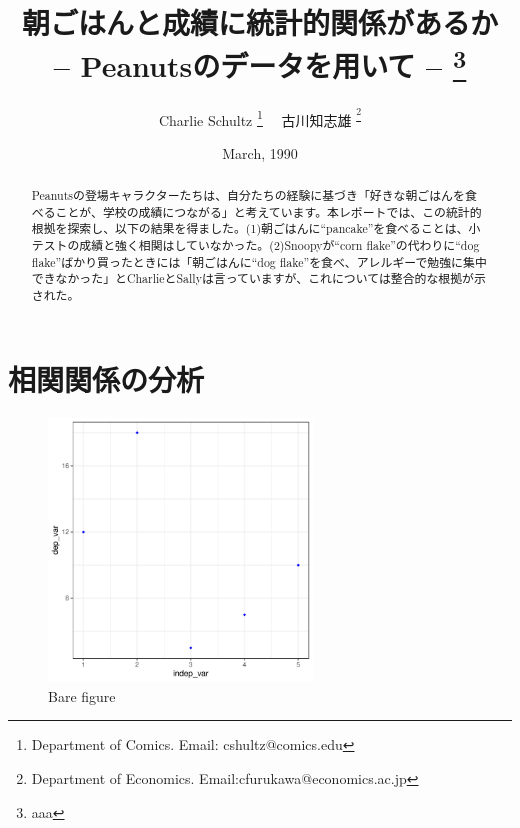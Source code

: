 \documentclass[xelatex,ja=standard]{bxjsarticle}
\title{朝ごはんと成績に統計的関係があるか \\ -- Peanutsのデータを用いて -- \thanks{aaa}}
\author{Charlie Schultz
\thanks{Department of Comics. Email: cshultz@comics.edu}  \ \  古川知志雄
\textsuperscript\thanks{Department of Economics. Email:cfurukawa@economics.ac.jp}}
\date{March, 1990}
\begin{document}
\renewcommand\footnotelayout{\small}
\sffamily\mdseries

\maketitle

\vspace{-10pt}\begin{abstract}
\begin{spacing}{1}
\noindent 
Peanutsの登場キャラクターたちは、自分たちの経験に基づき「好きな朝ごはんを食べることが、学校の成績につながる」と考えています。本レポートでは、この統計的根拠を探索し、以下の結果を得ました。(1)朝ごはんに``pancake''を食べることは、小テストの成績と強く相関はしていなかった。(2)Snoopyが``corn flake''の代わりに``dog flake''ばかり買ったときには「朝ごはんに``dog flake''を食べ、アレルギーで勉強に集中できなかった」とCharlieとSallyは言っていますが、これについては整合的な根拠が示された。\\

\end{spacing}
\end{abstract}

\newpage

\section{相関関係の分析} 


\begin{figure}
\centering
\includegraphics[width=7cm]{04_analyze/scatter_regress/figure/figure.pdf}

\label{fig:img1}
\caption{Bare figure}
\end{figure}

\mcfamily\mdseries


\end{document}
